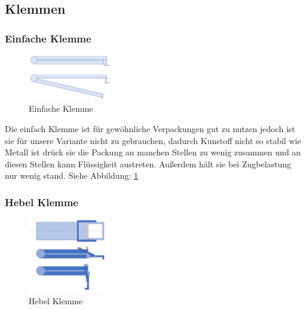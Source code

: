 \subsection{Klemmen}
\subsubsection{Einfache Klemme}

\begin{figure}
\vspace{-20pt}
  \begin{center}
    \includegraphics[width=0.32\textwidth]{Bilder/Powerpoint/Einfach_Klemme}
  \end{center}
  \caption{Einfache Klemme}
  \label{Einfache Klemme}
  \vspace{-30pt}
\end{figure}

Die einfach Klemme ist für gewöhnliche Verpackungen gut zu nutzen jedoch ist sie für unsere Variante nicht zu gebrauchen, dadurch Kunstoff nicht so stabil wie Metall ist drück sie die Packung an manchen Stellen zu wenig zusammen und an diesen Stellen kann Flüssigkeit austreten. Außerdem hält sie bei Zugbelastung nur wenig stand. Siehe Abbildung: \ref{Einfache Klemme}

\subsubsection{Hebel Klemme} 

\begin{figure}
\vspace{-30pt}
  \begin{center}
    \includegraphics[width=0.32\textwidth]{Bilder/Powerpoint/Hebel_Klemme}
  \end{center}
  \caption{Hebel Klemme}
  \label{Hebel Klemme}
  \vspace{-80pt}
\end{figure}

